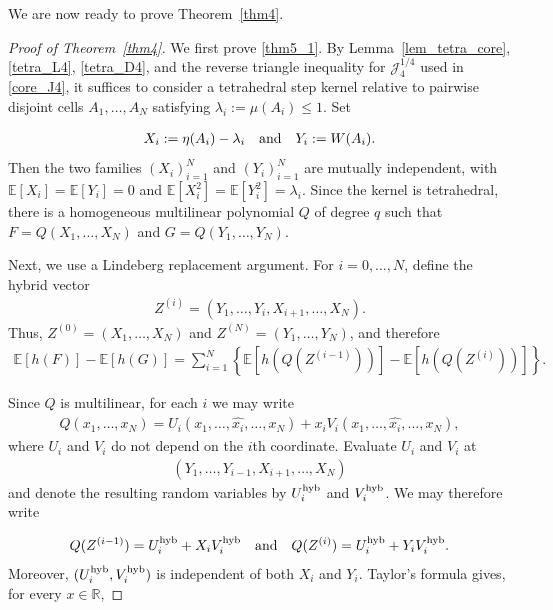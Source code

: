 \documentclass[letterpaper,11pt,reqno]{amsart}
\numberwithin{equation}{section}
\theoremstyle{plain}
\theoremstyle{definition}
\theoremstyle{remark}
\newcommand{\E}{\mathbb{E}}
\newcommand{\R}{\mathbb{R}}
\newcommand{\noi}{\noindent}
\newcommand{\Jfour}{\mathcal J_4}
\newcommand{\AND}{\quad{\rm and}\quad}
\begin{document}
We are now ready to prove Theorem~\ref{thm4}.

\begin{proof}[Proof of Theorem~\ref{thm4}]

We first prove \eqref{thm5_1}.  By Lemma~\ref{lem_tetra_core},
\eqref{tetra_L4}, \eqref{tetra_D4}, and the reverse triangle
inequality for $\Jfour^{1/4}$ used in \eqref{core_J4}, it suffices to
consider a tetrahedral step kernel relative to pairwise disjoint cells
$A_1,\ldots,A_N$ satisfying $\lambda_i:=\mu(A_i)\leq1$.
Set

\noi
\begin{align*}
 X_i:=\eta(A_i)-\lambda_i
 \AND
 Y_i:=W(A_i).
\end{align*}
Then the two families $(X_i)_{i=1}^N$ and $(Y_i)_{i=1}^N$ are
mutually independent, with $\E[X_i]=\E[Y_i]=0$ and
$\E[X_i^2]=\E[Y_i^2]=\lambda_i$.
Since the kernel is tetrahedral, there is a homogeneous multilinear
polynomial $Q$ of degree $q$ such that
$ F=Q(X_1,\ldots,X_N)$ and $G=Q(Y_1,\ldots,Y_N)$.


Next, we use a Lindeberg replacement argument.  For $i=0,\ldots,N$, define
the hybrid vector
\noi
\begin{align*}
 Z^{(i)}=(Y_1,\ldots,Y_i,X_{i+1},\ldots,X_N).
\end{align*}
Thus, $Z^{(0)}=(X_1,\ldots,X_N)$ and
$Z^{(N)}=(Y_1,\ldots,Y_N)$, and therefore
\noi
\begin{align}
 \E[h(F)]-\E[h(G)]
 =
 \sum_{i=1}^N
 \left\{
 \E[h(Q(Z^{(i-1)}))]
 -
 \E[h(Q(Z^{(i)}))]
 \right\}.
 \label{Lind_tel}
\end{align}

Since $Q$ is multilinear, for each $i$ we may write
\noi
\begin{align*}
 Q(x_1,\ldots,x_N)
 =
 U_i(x_1,\ldots,\widehat{x_i},\ldots,x_N)
 +
 x_iV_i(x_1,\ldots,\widehat{x_i},\ldots,x_N),
\end{align*}
where $U_i$ and $V_i$ do not depend on the $i$th coordinate.
Evaluate $U_i$ and $V_i$ at
\noi
\begin{align*}
 (Y_1,\ldots,Y_{i-1},X_{i+1},\ldots,X_N)
\end{align*}
and denote the resulting random variables by
$U_i^{\rm hyb}$ and $V_i^{\rm hyb}$.  We may therefore write

\noi
\begin{align*}
 Q(Z^{(i-1)})
 =
 U_i^{\rm hyb}+X_iV_i^{\rm hyb}
 \AND
 Q(Z^{(i)})
 =
 U_i^{\rm hyb}+Y_iV_i^{\rm hyb}.
\end{align*}
Moreover, $(U_i^{\rm hyb},V_i^{\rm hyb})$ is independent of both
$X_i$ and $Y_i$.  Taylor's formula gives, for every $x\in\R$,


\end{proof}
\end{document}
